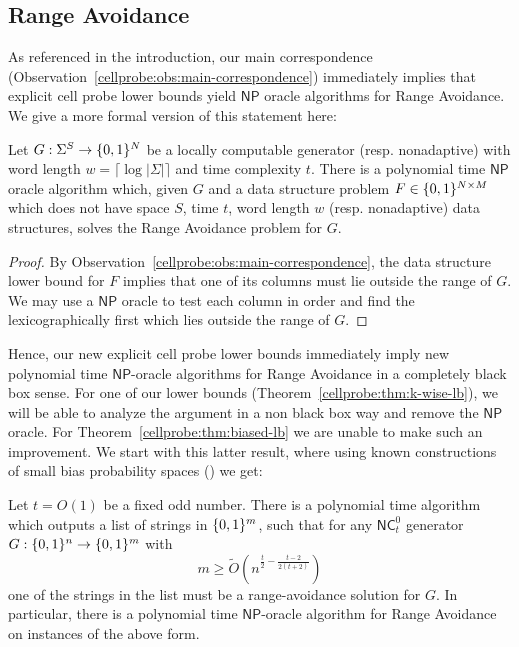 \subsection{Range Avoidance}
As referenced in the introduction, our main correspondence (Observation~\ref{cellprobe:obs:main-correspondence}) immediately implies that explicit cell probe lower bounds yield $\mathsf{NP}$ oracle algorithms for Range Avoidance. We give a more formal version of this statement here:
\begin{lemma}\label{cellprobe:lem:lb-yields-pnp-avoid}
Let $G: \Sigma^S \to \{0,1\}^N$ be a locally computable generator (resp. nonadaptive) with word length $w = \lceil \log |\Sigma|\rceil $ and time complexity $t$. There is a polynomial time $\mathsf{NP}$ oracle algorithm which, given $G$ and a data structure problem $F \in \{0,1\}^{N \times M}$ which does not have space $S$, time $t$, word length $w$ (resp. nonadaptive) data structures, solves the Range Avoidance problem for $G$.
\end{lemma}
\begin{proof}
By Observation~\ref{cellprobe:obs:main-correspondence}, the data structure lower bound for $F$ implies that one of its columns must lie outside the range of $G$. We may use a $\mathsf{NP}$ oracle to test each column in order and find the lexicographically first which lies outside the range of $G$.
\end{proof}
Hence, our new explicit cell probe lower bounds immediately imply new polynomial time $\mathsf{NP}$-oracle algorithms for Range Avoidance in a completely black box sense. 
For one of our lower bounds (Theorem~\ref{cellprobe:thm:k-wise-lb}), we will be able to analyze the argument in a non black box way and remove the $\mathsf{NP}$ oracle. For Theorem~\ref{cellprobe:thm:biased-lb} we are unable to make such an improvement. We start with this latter result, where using known constructions of small bias probability spaces (\cite{naornaor}) we get:

\begin{theorem*}
Let $t = O(1)$ be a fixed odd number. There is a polynomial time algorithm which outputs a list of strings in $\{0,1\}^m$, such that for any $\mathsf{NC}^0_t$ generator $G: \{0,1\}^n \to \{0,1\}^m$ with
\[
m \geq  \tilde{O}( n^{\frac{t}{2} - \frac{t-2}{2(t+2)}})
\]
one of the strings in the list must be a range-avoidance solution for $G$. In particular, there is a polynomial time $\mathsf{NP}$-oracle algorithm for Range Avoidance on instances of the above form.
\end{theorem*}

